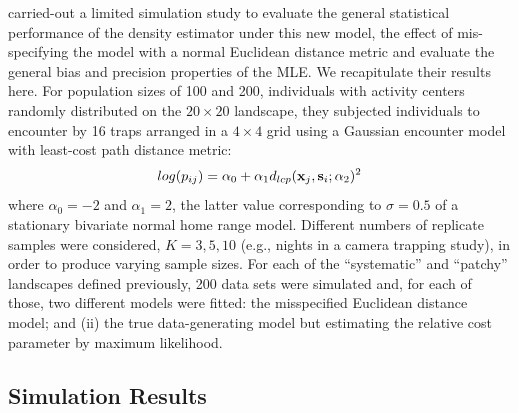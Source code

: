 \citet{royle_etal:2012ecol}
carried-out a limited simulation study to evaluate the
general statistical performance of the density estimator under
this new model, the effect of mis-specifying the model with a
normal Euclidean distance metric and evaluate the general bias and
precision properties of the MLE.
We recapitulate their results here.
For population sizes of 100 and 200, individuals with activity
centers randomly distributed on the $20 \times 20$ landscape, they
subjected individuals
to encounter by 16 traps arranged in a $4\times 4$ grid
using a Gaussian
encounter model with least-cost path distance metric:
\[
log(p_{ij})= \alpha_{0} + \alpha_{1} d_{lcp}({\bf x}_{j},{\bf
  s}_{i}; \alpha_{2})^{2}
\]
where  $\alpha_{0} = -2$ and $\alpha_{1} = 2$, the latter value
corresponding to $\sigma = 0.5$ of a stationary bivariate normal home
range model.  Different numbers of replicate samples were considered,
$K=3,5,10$
(e.g., nights in a camera trapping study), in order
to produce varying sample
sizes.
For each of the ``systematic'' and ``patchy'' landscapes defined
previously, 200 data sets were simulated and, for each of those, two
different models were fitted: the misspecified Euclidean distance
model; and (ii) the true data-generating model but estimating the
relative cost parameter by maximum likelihood.

\subsection{Simulation Results}

